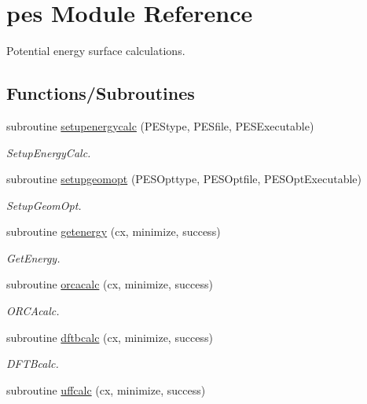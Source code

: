 \hypertarget{namespacepes}{}\section{pes Module Reference}
\label{namespacepes}


Potential energy surface calculations.  


\subsection*{Functions/\+Subroutines}
\begin{DoxyCompactItemize}
\item 
subroutine \mbox{\hyperlink{namespacepes_a836bf4b305457df700a5520d6d505ee7}{setupenergycalc}} (P\+E\+Stype, P\+E\+Sfile, P\+E\+S\+Executable)
\begin{DoxyCompactList}\small\item\em Setup\+Energy\+Calc. \end{DoxyCompactList}\item 
subroutine \mbox{\hyperlink{namespacepes_a4a1ef51f594097f9dfce8ebcdf864782}{setupgeomopt}} (P\+E\+S\+Opttype, P\+E\+S\+Optfile, P\+E\+S\+Opt\+Executable)
\begin{DoxyCompactList}\small\item\em Setup\+Geom\+Opt. \end{DoxyCompactList}\item 
subroutine \mbox{\hyperlink{namespacepes_a91b500ad9eae04b998b48e3ede7b1ad3}{getenergy}} (cx, minimize, success)
\begin{DoxyCompactList}\small\item\em Get\+Energy. \end{DoxyCompactList}\item 
subroutine \mbox{\hyperlink{namespacepes_a6b568c2913c8ad55cce5d368183af9c0}{orcacalc}} (cx, minimize, success)
\begin{DoxyCompactList}\small\item\em O\+R\+C\+Acalc. \end{DoxyCompactList}\item 
subroutine \mbox{\hyperlink{namespacepes_a6b9874a523e27244b65c34e696f2a67d}{dftbcalc}} (cx, minimize, success)
\begin{DoxyCompactList}\small\item\em D\+F\+T\+Bcalc. \end{DoxyCompactList}\item 
subroutine \mbox{\hyperlink{namespacepes_a3c31f7c822b9f71d668245f72cc453b0}{uffcalc}} (cx, minimize, success)

\end{DoxyCompactItemize}

